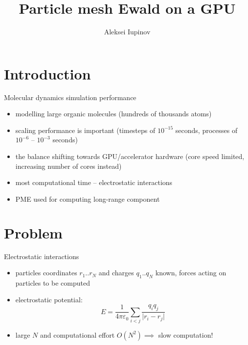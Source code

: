 \documentclass[11pt]{beamer}
\author{Aleksei Iupinov}
\title{Particle mesh Ewald on a GPU}
\institute{KTH Royal Institute of Technology}
\begin{document}
\begin{frame}
\titlepage
\end{frame}

\begin{frame}
\tableofcontents
\end{frame}

\section{Introduction}
\begin{frame}{Molecular dynamics simulation performance}
\begin{itemize}
\item modelling large organic molecules (hundreds of thousands atoms)
\item scaling performance is important (timesteps of $10^{-15}$ seconds, processes of $10^{-6}$ -- $10^{-3}$ seconds) 
\item the balance shifting towards GPU/accelerator hardware (core speed limited, increasing number of cores instead)
\item most computational time -- electrostatic interactions
\item PME used for computing long-range component
\end{itemize}
\end{frame}

\section{Problem}
\begin{frame}{Electrostatic interactions}
\begin{itemize}
\item particles coordinates $r_1 .. r_N$ and charges $q_1 .. q_N$ known, forces acting on particles to be computed 
\item electrostatic potential:
\[E = \frac{1}{4 \pi \varepsilon_0}\sum\limits_{i < j}\frac{q_i q_j}{\lvert r_i-r_j\rvert}\]
\item large $N$ and computational effort $O(N^2) \implies$ slow computation!
\end{itemize}
\end{frame}
\end{document}
